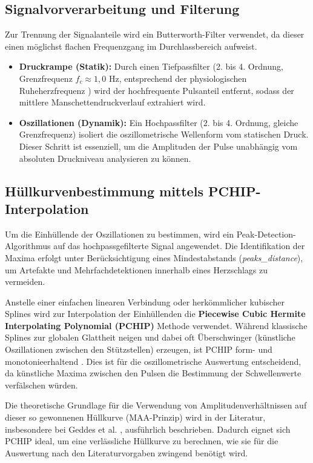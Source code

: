 \documentclass[a4paper, 11pt]{scrartcl}
\newcommand{\q}[1]{\glqq#1\grqq{}} %
\begin{document}
\subsection{Signalvorverarbeitung und Filterung}
Zur Trennung der Signalanteile wird ein Butterworth-Filter verwendet, da dieser einen möglichst flachen Frequenzgang im Durchlassbereich aufweist. 
\begin{itemize}
    \item \textbf{Druckrampe (Statik):} Durch einen Tiefpassfilter (2. bis 4. Ordnung, Grenzfrequenz $f_c \approx 1,0$ Hz, entsprechend der physiologischen Ruheherzfrequenz \cite[Chapter III, S. 112]{guyton2015textbook}) wird der hochfrequente Pulsanteil entfernt, sodass der mittlere Manschettendruckverlauf extrahiert wird.
    \item \textbf{Oszillationen (Dynamik):} Ein Hochpassfilter (2. bis 4. Ordnung, gleiche Grenzfrequenz) isoliert die oszillometrische Wellenform vom statischen Druck. Dieser Schritt ist essenziell, um die Amplituden der Pulse unabhängig vom absoluten Druckniveau analysieren zu können.
\end{itemize}

\subsection{Hüllkurvenbestimmung mittels PCHIP-Interpolation}
Um die Einhüllende der Oszillationen zu bestimmen, wird ein Peak-Detection-Algorithmus auf das hochpassgefilterte Signal angewendet. Die Identifikation der Maxima erfolgt unter Berücksichtigung eines Mindestabstands (\textit{peaks\_distance}), um Artefakte und Mehrfachdetektionen innerhalb eines Herzschlags zu vermeiden.

Anstelle einer einfachen linearen Verbindung oder herkömmlicher kubischer Splines wird zur Interpolation der Einhüllenden die \textbf{Piecewise Cubic Hermite Interpolating Polynomial (PCHIP)} Methode verwendet. Während klassische Splines zur globalen Glattheit neigen und dabei oft \q{Überschwinger} (künstliche Oszillationen zwischen den Stützstellen) erzeugen, ist PCHIP form- und monotonieerhaltend \cite{fritsch1980monotone}. Dies ist für die oszillometrische Auswertung entscheidend, da künstliche Maxima zwischen den Pulsen die Bestimmung der Schwellenwerte verfälschen würden.

Die theoretische Grundlage für die Verwendung von Amplitudenverhältnissen auf dieser so gewonnenen Hüllkurve (MAA-Prinzip) wird in der Literatur, insbesondere bei Geddes et al. \cite{Formulas}, ausführlich beschrieben. Dadurch eignet sich PCHIP ideal, um eine verlässliche Hüllkurve zu berechnen, wie sie für die Auswertung nach den Literaturvorgaben zwingend benötigt wird.
\end{document}
